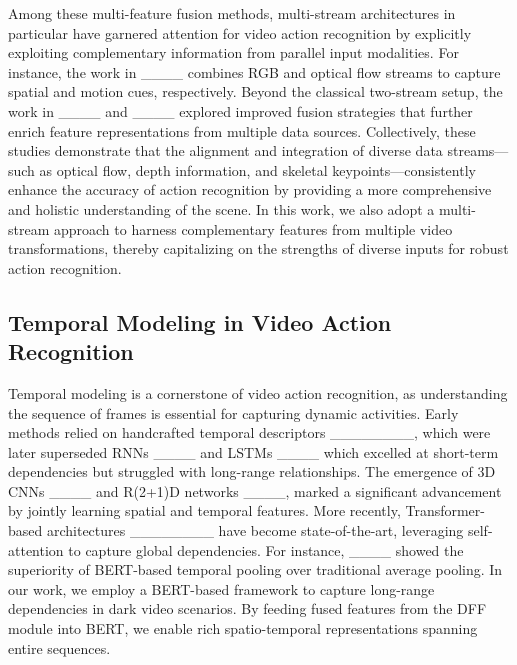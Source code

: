 Among these multi-feature fusion methods, multi-stream architectures in particular have garnered attention for video action recognition by explicitly exploiting complementary information from parallel input modalities. For instance, the work in ____ combines RGB and optical flow streams to capture spatial and motion cues, respectively. Beyond the classical two-stream setup, the work in ____ and ____ explored improved fusion strategies that further enrich feature representations from multiple data sources. 
Collectively, these studies demonstrate that the alignment and integration of diverse data streams—such as optical flow, depth information, and skeletal keypoints—consistently enhance the accuracy of action recognition by providing a more comprehensive and holistic understanding of the scene. In this work, we also adopt a multi-stream approach to harness complementary features from multiple video transformations, thereby capitalizing on the strengths of diverse inputs for robust action recognition.

\subsection{Temporal Modeling in Video Action Recognition}

Temporal modeling is a cornerstone of video action recognition, as understanding the sequence of frames is essential for capturing dynamic activities. Early methods relied on handcrafted temporal descriptors ________, which were later superseded RNNs ____ and LSTMs ____ which excelled at short-term dependencies but struggled with long-range relationships. The emergence of 3D CNNs ____ and R(2+1)D networks ____, marked a significant advancement by jointly learning spatial and temporal features. More recently, Transformer-based architectures ________ have become state-of-the-art, leveraging self-attention to capture global dependencies. For instance, ____ showed the superiority of BERT-based temporal pooling over traditional average pooling. In our work, we employ a BERT-based framework to capture long-range dependencies in dark video scenarios. By feeding fused features from the DFF module into BERT, we enable rich spatio-temporal representations spanning entire sequences.

